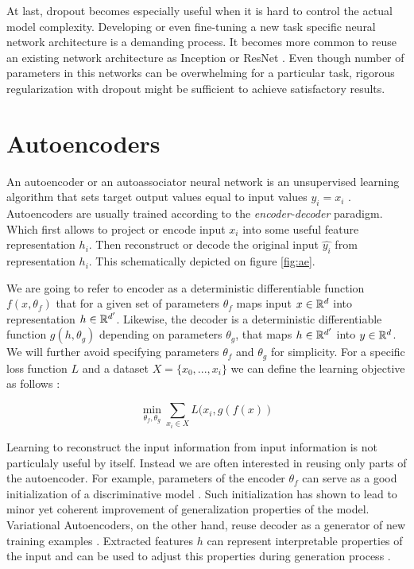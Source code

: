 At last, dropout becomes especially useful when it is hard to control the actual model complexity. Developing or even fine-tuning a new task specific neural network architecture is a demanding process. It becomes more common to reuse an existing network architecture as Inception or ResNet \cite{He2015, Szegedy2016}. Even though number of parameters in this networks can be overwhelming for a particular task, rigorous regularization with dropout might be sufficient to achieve satisfactory results.


\section{Autoencoders}\label{ch:ae}
An autoencoder or an autoassociator neural network is an unsupervised learning algorithm that sets target output values equal to input values $y_i=x_i$ \cite{Ng2011,RanzatoMarcAurelio2007}.
Autoencoders are usually trained according to the \textit{encoder-decoder} paradigm.
Which first allows to project or encode input $x_i$ into some useful feature representation $h_i$.
Then reconstruct or decode the original input $\hat{y_i}$ from representation $h_i$.
This schematically depicted on figure \ref{fig:ae}.





We are going to refer to encoder as a deterministic differentiable function $f(x, \theta_f)$ that for a given set of parameters $\theta_f$ maps input $x\in \Bbb{R}^d$ into representation $h \in \Bbb{R}^{d'}$.
Likewise, the decoder is a deterministic differentiable function $g(h, \theta_g)$ depending on parameters $\theta_g$, that maps $h\in\Bbb{R}^{d'}$ into $y\in \Bbb{R}^d$. We will further avoid specifying parameters $\theta_f$ and $\theta_g$ for simplicity.
For a specific loss function $L$ and a dataset $X=\{x_0, ..., x_i\}$ we can define the learning objective as follows \cite{Good2016}:

\begin{equation}\label{eq:ae}
\min_{\theta_f, \theta_g}\sum\limits_{x_i \in X}{L(x_i, g(f(x))}
\end{equation}

Learning to reconstruct the input information from input information is not particulaly useful by itself.
Instead we are often interested in reusing only parts of the autoencoder.
For example, parameters of the encoder $\theta_f$ can serve as a good initialization of a discriminative model \cite{Masci2011, Vincent2010, Zhao2015}.
Such initialization has shown to lead to minor yet coherent improvement of generalization properties of the model.
Variational Autoencoders, on the other hand, reuse decoder as a generator of new training examples \cite{Kingma2013}.
Extracted features $h$ can represent interpretable properties of the input and can be used to adjust this
properties during generation process \cite{Kulkarni2015, Whitney2016}.

